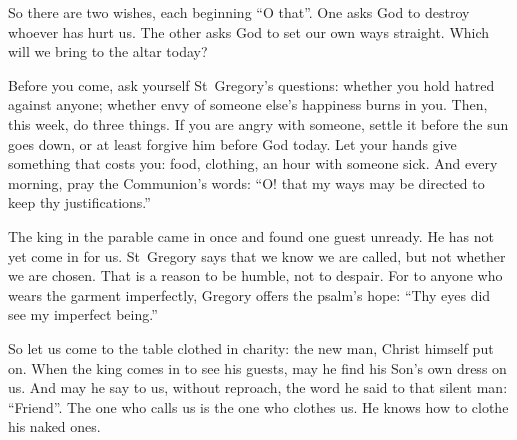 So there are two wishes, each beginning ``O that''. One asks God to destroy
whoever has hurt us. The other asks God to set our own ways straight. Which
will we bring to the altar today?

Before you come, ask yourself St~Gregory's questions: whether you hold hatred
against anyone; whether envy of someone else's happiness burns in you. Then,
this week, do three things. If you are angry with someone, settle it before the
sun goes down, or at least forgive him before God today. Let your hands give
something that costs you: food, clothing, an hour with someone sick. And every
morning, pray the Communion's words: ``O! that my ways may be directed to keep
thy justifications.''

\bigskip

The king in the parable came in once and found one guest unready. He has not
yet come in for us. St~Gregory says that we know we are called, but not whether
we are chosen. That is a reason to be humble, not to despair. For to anyone who
wears the garment imperfectly, Gregory offers the psalm's hope: ``Thy eyes did
see my imperfect being.''

So let us come to the table clothed in charity: the new man, Christ himself put
on. When the king comes in to see his guests, may he find his Son's own dress
on us. And may he say to us, without reproach, the word he said to that silent
man: ``Friend''. The one who calls us is the one who clothes us. He knows how
to clothe his naked ones.
